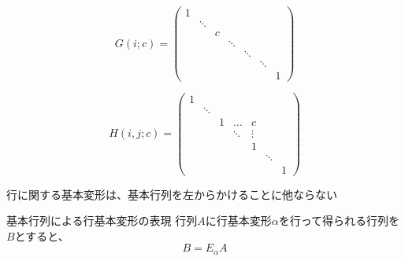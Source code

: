 \documentclass[../../../topic_linear-algebra]{subfiles}
\begin{document}
\begin{equation*}
  G(i;c) = \begin{pmatrix}
    1                                            \\
     & \ddots                                    \\
     &        & c &                              \\
     &        &   & \ddots                       \\
     &        &   &        & \ddots              \\
     &        &   &        &        & \ddots     \\
     &        &   &        &        &        & 1
  \end{pmatrix}
\end{equation*}

\begin{equation*}
  H(i,j;c) = \begin{pmatrix}
    1                                            \\
     & \ddots                                    \\
     &        & 1 & \dots  & c                   \\
     &        &   & \ddots & \vdots              \\
     &        &   &        & 1                   \\
     &        &   &        &        & \ddots     \\
     &        &   &        &        &        & 1
  \end{pmatrix}
\end{equation*}

\sectionline

行に関する基本変形は、基本行列を左からかけることに他ならない

\begin{theorem}{基本行列による行基本変形の表現}
  行列$A$に行基本変形$\alpha$を行って得られる行列を$B$とすると、
  \begin{equation*}
    B = E_\alpha A
  \end{equation*}
\end{theorem}
\end{document}
